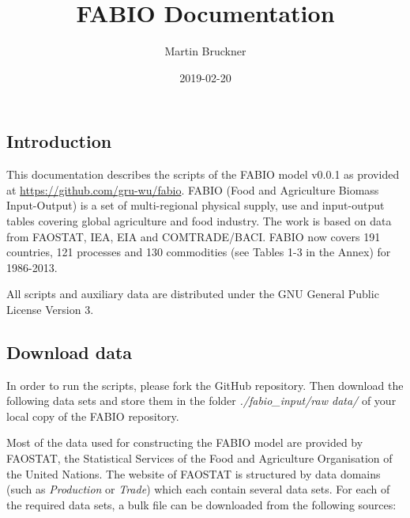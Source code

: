 \documentclass[]{article}
\title{FABIO Documentation}
\author{Martin Bruckner}
\date{2019-02-20}
\begin{document}
\maketitle

\sloppy

\subsection{Introduction}\label{introduction}

This documentation describes the scripts of the FABIO model v0.0.1 as
provided at \url{https://github.com/gru-wu/fabio}. FABIO (Food and
Agriculture Biomass Input-Output) is a set of multi-regional physical
supply, use and input-output tables covering global agriculture and food
industry. The work is based on data from FAOSTAT, IEA, EIA and
COMTRADE/BACI. FABIO now covers 191 countries, 121 processes and 130
commodities (see Tables 1-3 in the Annex) for 1986-2013.

All scripts and auxiliary data are distributed under the GNU General
Public License Version 3.

\subsection{Download data}\label{download-data}

In order to run the scripts, please fork the GitHub repository. Then
download the following data sets and store them in the folder
\emph{./fabio\_input/raw data/} of your local copy of the FABIO
repository.

Most of the data used for constructing the FABIO model are provided by
FAOSTAT, the Statistical Services of the Food and Agriculture
Organisation of the United Nations. The website of FAOSTAT is structured
by data domains (such as \emph{Production} or \emph{Trade}) which each
contain several data sets. For each of the required data sets, a bulk
file can be downloaded from the following sources:
\end{document}
